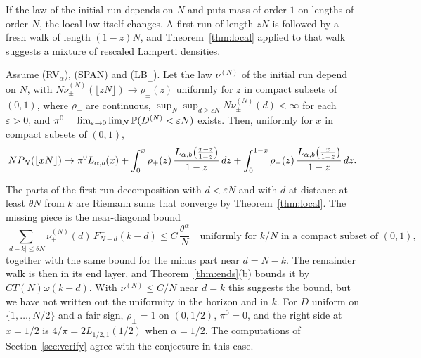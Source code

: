 If the law of the initial run depends on $N$ and puts mass of order $1$ on lengths of
order $N$, the local law itself changes. A first run of length $zN$ is followed by a fresh
walk of length $(1-z)N$, and Theorem~\ref{thm:local} applied to that walk suggests a mixture
of rescaled Lamperti densities.

\begin{conjecture}\label{rem:aging}
Assume (RV$_\alpha$), (SPAN) and (LB$_\pm$). Let the law $\nu^{(N)}$ of the initial run
depend on $N$, with $N\nu^{(N)}_\pm(\lfloor zN\rfloor)\to\rho_\pm(z)$ uniformly for $z$ in
compact subsets of $(0,1)$, where $\rho_\pm$ are continuous,
$\sup_N\sup_{d\ge\varepsilon N}N\nu^{(N)}_\pm(d)<\infty$ for each $\varepsilon>0$, and
$\pi^0=\lim_{\varepsilon\to0}\lim_N\mathbb{P}(D^{(N)}<\varepsilon N)$ exists. Then, uniformly for $x$
in compact subsets of $(0,1)$,
\[
 NP_N(\lfloor xN\rfloor)\to\pi^0L_{\alpha,b}(x)+\int_0^x\rho_{+}(z)\,\frac{L_{\alpha,b}\bigl(\frac{x-z}{1-z}\bigr)}{1-z}\,dz
 +\int_0^{1-x}\rho_{-}(z)\,\frac{L_{\alpha,b}\bigl(\frac x{1-z}\bigr)}{1-z}\,dz .
\]
\end{conjecture}

The parts of the first-run decomposition with $d<\varepsilon N$ and with $d$ at distance at
least $\theta N$ from $k$ are Riemann sums that converge by Theorem~\ref{thm:local}. The
missing piece is the near-diagonal bound
\[
 \sum_{|d-k|\le\theta N}\nu^{(N)}_\plus(d)\,F^\minus_{N-d}(k-d)\le C\,\frac{\theta^\alpha}N
 \quad\text{uniformly for $k/N$ in a compact subset of $(0,1)$},
\]
together with the same bound for the minus part near $d=N-k$. The remainder walk is then in
its end layer, and Theorem~\ref{thm:ends}(b) bounds it by $CT(N)\omega(k-d)$. With
$\nu^{(N)}\le C/N$ near $d=k$ this suggests the bound, but we have not written out the
uniformity in the horizon and in $k$. For $D$ uniform on $\{1,\dots,N/2\}$ and a fair sign,
$\rho_\pm=1$ on $(0,1/2)$, $\pi^0=0$, and the right side at $x=1/2$ is $4/\pi=2L_{1/2,1}(1/2)$
when $\alpha=1/2$. The computations of Section~\ref{sec:verify} agree with the conjecture in
this case.
